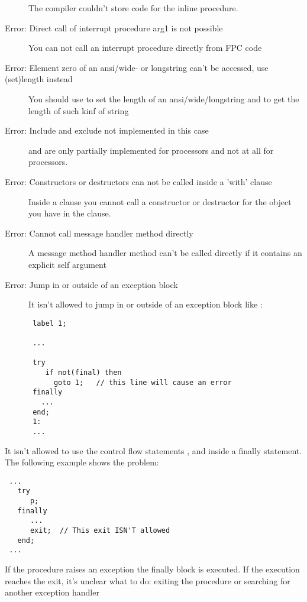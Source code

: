 \begin{description}
 The compiler couldn't store code for the inline procedure.
\item [Error: Direct call of interrupt procedure arg1 is not possible]
 You can not call an interrupt procedure directly from FPC code
\item [Error: Element zero of an ansi/wide- or longstring can't be accessed, use (set)length instead]
 You should use  to set the length of an ansi/wide/longstring
 and  to get the length of such kinf of string
\item [Error: Include and exclude not implemented in this case]
  and  are only partially
 implemented for  processors
 and not at all for  processors.
\item [Error: Constructors or destructors can not be called inside a 'with' clause]
 Inside a  clause you cannot call a constructor or destructor for the
 object you have in the  clause.
\item [Error: Cannot call message handler method directly]
 A message method handler method can't be called directly if it contains an
 explicit self argument
\item [Error: Jump in or outside of an exception block]
 It isn't allowed to jump in or outside of an exception block like :
 \begin{verbatim}
 label 1;

 ...

 try
    if not(final) then
      goto 1;   // this line will cause an error
 finally
   ...
 end;
 1:
 ...
 \end{verbatim}
 \end{description}
\item [Error: Control flow statements aren't allowed in a finally block]
 It isn't allowed to use the control flow statements ,
  and 
 inside a finally statement. The following example shows the problem:
 \begin{verbatim}
 ...
   try
      p;
   finally
      ...
      exit;  // This exit ISN'T allowed
   end;
 ...

 \end{verbatim}
 If the procedure  raises an exception the finally block is
 executed. If the execution reaches the exit, it's unclear what to do:
 exiting the procedure or searching for another exception handler

